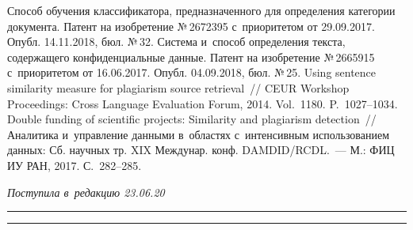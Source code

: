 \begin{multicols}{2}
{{\begin{thebibliography}{99}
 Способ обучения 
классификатора, предназначенного для определения категории документа. Патент на 
изобретение №\,2672395 с~приоритетом от 29.09.2017. Опубл. 14.11.2018, бюл. №\,32.
 Система и~способ определения текста, содержащего 
конфиденциальные данные. Патент на изобретение №\,2665915 с~приоритетом от 
16.06.2017. Опубл. 04.09.2018, бюл. №\,25.
 Using sentence similarity measure for plagiarism source 
retrieval~// CEUR Workshop Proceedings: Cross Language Evaluation Forum, 2014. Vol.~1180.
P.~1027--1034.
 Double funding of 
scientific projects: Similarity and plagiarism detection~// Аналитика и~управ\-ле\-ние данными 
в~областях с~интенсивным использованием данных: Сб. научных тр. XIX Междунар. конф. 
\mbox{DAMDID}/RCDL.~--- М.: ФИЦ ИУ РАН, 2017. С.~282--285.

\end{thebibliography}

 }
 }

\end{multicols}

\vspace*{-6pt}

\hfill{\small\textit{Поступила в~редакцию 23.06.20}}

\vspace*{7pt}




\hrule

\vspace*{2pt}

\hrule

\vspace*{8pt}

\def\tit{EXTRACTION OF CONFIDENTIALITY MARKERS\\ FROM TEXTS 
UNDER CONDITIONS OF HIGH UNCERTAINTY\\ IN SYSTEMS WITH DATA 
INTENSIVE USAGE}


\def\titkol{Extraction of confidentiality markers from texts under conditions of 
high uncertainty in systems with data intensive usage}


\def\aut{V.\,I.~Budzko$^1$, V.\,V.~Yadrintsev$^{1,2}$, I.\,V.~Sochenkov$^1$, 
V.\,I.~Korolev$^1$, and~V.\,G.~Belenkov$^1$}

